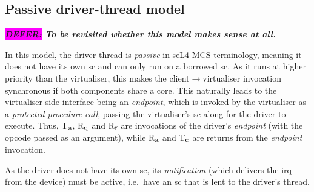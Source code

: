\documentclass[a4paper,12pt]{report}
\newcommand{\DEFER}[1]{\textbf{\textsl{\colorbox{magenta}{DEFER:} #1}}}
\newcommand{\DEFER}[1]{\relax}
\newcommand{\Obj}[1]{\textsl{#1}}
\newcommand{\Ra}{R\(_{\mbox{\footnotesize a}}\)\xspace}
\newcommand{\Tc}{T\(_{\mbox{\footnotesize c}}\)\xspace}
\newcommand{\Ta}{T\(_{\mbox{\footnotesize a}}\)\xspace}
\newcommand{\Rq}{R\(_{\mbox{\footnotesize q}}\)\xspace}
\newcommand{\Rf}{R\(_{\mbox{\footnotesize f}}\)\xspace}
\begin{document}
\subsection{Passive driver-thread model}

\DEFER{To be revisited whether this model makes sense at all.}

In this model, the driver thread is \emph{passive} in seL4 MCS
terminology, meaning it does not have its own \gls{sc} and can only run on
a borrowed \gls{sc}. As it runs at higher priority than the virtualiser, this makes
the client\(\rightarrow\)virtualiser invocation synchronous if both
components share a core. This
naturally leads to the virtualiser-side interface being an \Obj{endpoint}, which
is invoked by the virtualiser as a \emph{protected procedure call}, passing the
virtualiser's \gls{sc} along for the driver to execute. Thus, \Ta, \Rq and  \Rf
are invocations of the driver's \Obj{endpoint} (with the opcode passed as an
argument), while \Ra and \Tc are returns from the \Obj{endpoint} invocation.

As the driver does not have its own \gls{sc}, its \Obj{notification} (which
delivers the \gls{irq} from the device) must be active, i.e.\ have an \gls{sc}
that is lent to the driver's thread.
\end{document}
